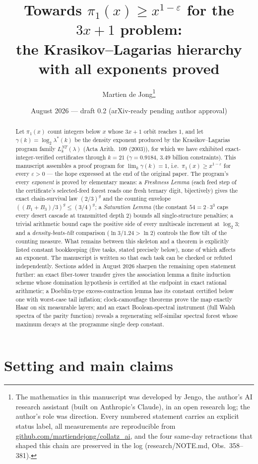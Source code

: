\documentclass[11pt]{article}
\title{Towards $\pi_1(x) \ge x^{1-\varepsilon}$ for the $3x+1$ problem:\\
the Krasikov--Lagarias hierarchy with all exponents proved}
\author{Martien de Jong\thanks{The mathematics in this manuscript was developed by
Jengo, the author's AI research assistant (built on Anthropic's Claude), in an
open research log; the author's role was direction. Every numbered statement
carries an explicit status label, all measurements are reproducible from
\href{https://github.com/martiendejong/collatz_ai}{github.com/martiendejong/collatz\_ai},
and the four same-day retractions that shaped this chain are preserved in the log
(research/NOTE.md, Obs.\ 358--381).}}
\date{August 2026 --- draft 0.2 (arXiv-ready pending author approval)}
\theoremstyle{definition}
\newcommand{\lam}{\lambda}
\begin{document}
\maketitle

\begin{abstract}
Let $\pi_1(x)$ count integers below $x$ whose $3x{+}1$ orbit reaches $1$, and let
$\gamma(k) = \log_2 \lam^*(k)$ be the density exponent produced by the
Krasikov--Lagarias program family $L_k^{NT}(\lam)$ (Acta Arith.\ 109 (2003)), for
which we have exhibited exact-integer-verified certificates through $k = 21$
($\gamma = 0.9184$, $3.49$ billion constraints). This manuscript assembles a proof
program for $\lim_k \gamma(k) = 1$, i.e.\ $\pi_1(x) \ge x^{1-\varepsilon}$ for
every $\varepsilon > 0$ --- the hope expressed at the end of the original paper.
The program's every \emph{exponent} is proved by elementary means: a
\emph{Freshness Lemma} (each feed step of the certificate's selected-feed forest
reads one fresh ternary digit, bijectively) gives the exact chain-survival law
$(2/3)^g$ and the counting envelope $((B_1{+}B_3)/3)^g \le (3/4)^g$; a
\emph{Saturation Lemma} (the constant $54 = 2\cdot 3^3$ caps every desert cascade
at transmitted depth $2$) bounds all single-structure penalties; a trivial
arithmetic bound caps the positive side of every multiscale increment at
$\log_2 3$; and a \emph{density-beats-tilt} comparison ($\ln 3 / 1.24 > \ln 2$)
controls the flow tilt of the counting measure. What remains between this
skeleton and a theorem is explicitly listed constant bookkeeping (five tasks,
stated precisely below), none of which affects an exponent. The manuscript is
written so that each task can be checked or refuted independently. Sections added in August 2026 sharpen the remaining open statement further: an exact fiber-tower transfer gives the association lemma a finite induction scheme whose domination hypothesis is certified at the endpoint in exact rational arithmetic; a Doeblin-type excess-contraction lemma has its constant certified below one with worst-case tail inflation; clock-camouflage theorems prove the map exactly Haar on six measurable layers; and an exact Boolean-spectral instrument (full Walsh spectra of the parity function) reveals a regenerating self-similar spectral forest whose maximum decays at the programme single deep constant.
\end{abstract}

\section{Setting and main claims}
\end{document}

